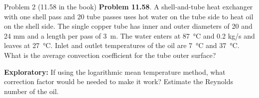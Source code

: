 \documentclass[9pt, aspectratio=169, handout]{beamer}
\begin{document}
\begin{frame}{Problem 2 (11.58 in the book)}
    \textbf{Problem 11.58}.
        A shell-and-tube heat exchanger with one shell pass and 20 tube passes uses hot water on the tube side to heat oil on the shell side.
        The single copper tube has inner and outer diameters of 20 and 24 \si{\milli\meter} and a length per pass of \SI{3}{m}.
        The water enters at \SI{87}{\celsius} and 0.2 kg/s and leaves at \SI{27}{\celsius}.
        Inlet and outlet temperatures of the oil are \SI{7}{\celsius} and \SI{37}{\celsius}.
        What is the average convection coefficient for the tube outer surface?

    \vspace{1ex}
    \textbf{Exploratory:}
        If using the logarithmic mean temperature method, what correction factor would be needed to make it work?
        Estimate the Reynolds number of the oil.
\end{frame}
\end{document}
